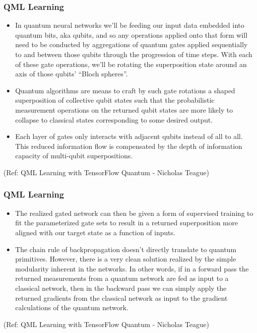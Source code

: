  \begin{frame}[fragile]\frametitle{QML Learning}
 

\begin{itemize}
\item  In quantum neural networks we’ll be feeding our input data embedded into quantum bits, aka qubits, and so any operations applied onto that form will need to be conducted by aggregations of quantum gates applied sequentially to and between those qubits through the progression of time steps. With each of these gate operations, we’ll be rotating the superposition state around an axis of those qubits’ “Bloch spheres”.
\item Quantum algorithms are means to craft by such gate rotations a shaped superposition of collective qubit states such that the probabilistic measurement operations on the returned qubit states are more likely to collapse to classical states corresponding to some desired output.
\item  Each layer of gates only interacts with adjacent qubits instead of all to all. This reduced information flow is compensated by the depth of information capacity of multi-qubit superpositions.

\end{itemize}

	
\tiny{(Ref: QML Learning with TensorFlow Quantum - Nicholas Teague)}

\end{frame}

 \begin{frame}[fragile]\frametitle{QML Learning}
 

\begin{itemize}
\item The realized gated network can then be given a form of supervised training to fit the parameterized gate sets to result in a returned superposition more aligned with our target state as a function of inputs. 
\item  The chain rule of backpropagation doesn’t directly translate to quantum primitives. However, there is a very clean solution realized by the simple modularity inherent in the networks. In other words, if in a forward pass the returned measurements from a quantum network are fed as input to a classical network, then in the backward pass we can simply apply the returned gradients from the classical network as input to the gradient calculations of the quantum network.
\end{itemize}

	
\tiny{(Ref: QML Learning with TensorFlow Quantum - Nicholas Teague)}

\end{frame}